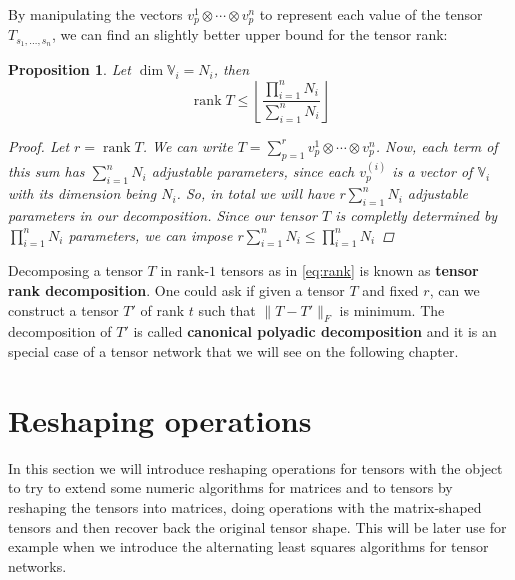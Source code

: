 \documentclass[11pt,a4paper,openright,oneside]{book}
\numberwithin{equation}{section}
\newtheorem{prop0}[defn0]{Proposition}
\newenvironment{proposition}{\bigskip \begin{prop0}}{\end{prop0}}
\newcommand{\refeq}[1]{\cref{#1}}
\DeclareMathOperator{\rank}{rank}
\begin{document}
By manipulating the vectors $v_p^1 \otimes \cdots \otimes v_p^n$ to represent each value of the tensor
$T_{s_1, \dots, s_n}$, we can find an slightly better upper bound for the tensor rank:
\begin{proposition} Let $\dim \mathbb{V}_i = N_i$, then
    \begin{equation} \label{eq:rank-dimensional-bound}
        \rank{T} \leqslant \left\lfloor \frac{\prod_{i=1}^n N_i}{\sum_{i=1}^n N_i} \right\rfloor
    \end{equation}

\begin{proof}
    Let $r = \rank{T}$. We can write $T = \sum_{p=1}^r v_p^{1} \otimes \cdots \otimes v_p^{n}$. Now, each term of this
    sum has $\sum_{i=1}^n N_i$ adjustable parameters, since each $v_p^{(i)}$ is a vector of $\mathbb{V}_i$ with its dimension being $N_i$.
    So, in total we will have $r \sum_{i=1}^n N_i$ adjustable parameters in our decomposition. Since our tensor $T$ is completly
    determined by $\prod_{i=1}^n N_i$ parameters, we can impose $r \sum_{i=1}^n N_i \leqslant \prod_{i=1}^n N_i$ 
\end{proof}
\end{proposition}

Decomposing a tensor $T$ in rank-$1$ tensors as in \refeq{eq:rank} is known as \textbf{tensor rank decomposition}.
One could ask if given a tensor $T$ and fixed $r$, can we construct a tensor $T'$ of rank $t$ such that
$\| T - T' \|_F$ is minimum. The decomposition of $T'$ is called \textbf{canonical polyadic decomposition} and it is
an special case of a tensor network that we will see on the following chapter.



\section{Reshaping operations}


In this section we will introduce reshaping operations for tensors with the object to try to extend some numeric algorithms for
matrices and to tensors by reshaping the tensors into matrices, doing operations with the matrix-shaped tensors and then recover
back the original tensor shape. This will be later use for example when we introduce the alternating least squares algorithms for tensor networks.
\end{document}

